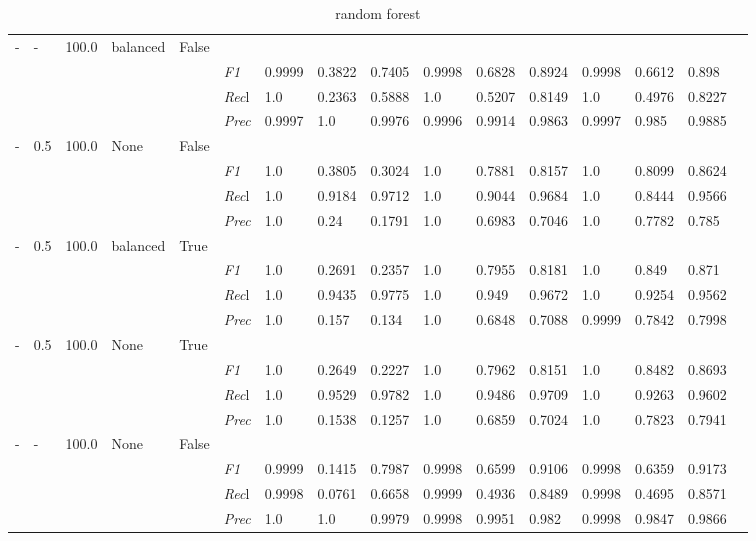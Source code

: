 \begin{table}[]
\begin{tabularx}{\textwidth}{XXXXX|X|XXX|XXX|XXXX}
    - & - & 100.0 & balanced & False& & & & & & & & & \\
    & & & & & \textit{F1} & 0.9999 & 0.3822 & 0.7405 & 0.9998 & 0.6828        & 0.8924        & 0.9998        & 0.6612        & 0.898        \\
    & & & & & \textit{Rec}l & 1.0 & 0.2363 & 0.5888    & 1.0 & 0.5207    & 0.8149    & 1.0    & 0.4976    & 0.8227    \\
    & & & & & \textit{Prec} & 0.9997 & 1.0 & 0.9976 & 0.9996 & 0.9914 & 0.9863 & 0.9997 & 0.985 & 0.9885 \\ \midrule
    - & 0.5 & 100.0 & None & False& & & & & & & & & \\
    & & & & & \textit{F1} & 1.0 & 0.3805 & 0.3024 & 1.0 & 0.7881        & 0.8157        & 1.0        & 0.8099        & 0.8624        \\
    & & & & & \textit{Rec}l & 1.0 & 0.9184 & 0.9712    & 1.0 & 0.9044    & 0.9684    & 1.0    & 0.8444    & 0.9566    \\
    & & & & & \textit{Prec} & 1.0 & 0.24 & 0.1791 & 1.0 & 0.6983 & 0.7046 & 1.0 & 0.7782 & 0.785 \\ \midrule
    - & 0.5 & 100.0 & balanced & True& & & & & & & & & \\
    & & & & & \textit{F1} & 1.0 & 0.2691 & 0.2357 & 1.0 & 0.7955        & 0.8181        & 1.0        & 0.849        & 0.871        \\
    & & & & & \textit{Rec}l & 1.0 & 0.9435 & 0.9775    & 1.0 & 0.949    & 0.9672    & 1.0    & 0.9254    & 0.9562    \\
    & & & & & \textit{Prec} & 1.0 & 0.157 & 0.134 & 1.0 & 0.6848 & 0.7088 & 0.9999 & 0.7842 & 0.7998 \\ \midrule
    - & 0.5 & 100.0 & None & True& & & & & & & & & \\
    & & & & & \textit{F1} & 1.0 & 0.2649 & 0.2227 & 1.0 & 0.7962        & 0.8151        & 1.0        & 0.8482        & 0.8693        \\
    & & & & & \textit{Rec}l & 1.0 & 0.9529 & 0.9782    & 1.0 & 0.9486    & 0.9709    & 1.0    & 0.9263    & 0.9602    \\
    & & & & & \textit{Prec} & 1.0 & 0.1538 & 0.1257 & 1.0 & 0.6859 & 0.7024 & 1.0 & 0.7823 & 0.7941 \\ \midrule
    - & - & 100.0 & None & False& & & & & & & & & \\
    & & & & & \textit{F1} & 0.9999 & 0.1415 & 0.7987 & 0.9998 & 0.6599        & 0.9106        & 0.9998        & 0.6359        & 0.9173        \\
    & & & & & \textit{Rec}l & 0.9998 & 0.0761 & 0.6658    & 0.9999 & 0.4936    & 0.8489    & 0.9998    & 0.4695    & 0.8571    \\
    & & & & & \textit{Prec} & 1.0 & 1.0 & 0.9979 & 0.9998 & 0.9951 & 0.982 & 0.9998 & 0.9847 & 0.9866 \\ \midrule
    \end{tabularx}
    \caption{random forest}
    \label{tab:all_results_random_forest}
    \end{table}
    
